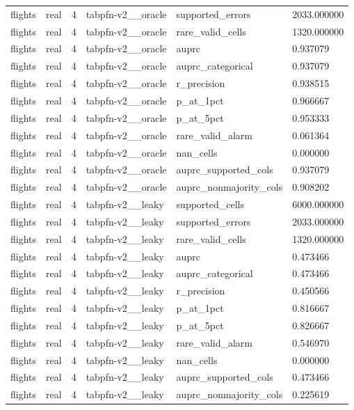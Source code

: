 \begin{tabular}{llllll}
flights & real & 4 & tabpfn-v2\_\_oracle & supported\_errors & 2033.000000 \\
flights & real & 4 & tabpfn-v2\_\_oracle & rare\_valid\_cells & 1320.000000 \\
flights & real & 4 & tabpfn-v2\_\_oracle & auprc & 0.937079 \\
flights & real & 4 & tabpfn-v2\_\_oracle & auprc\_categorical & 0.937079 \\
flights & real & 4 & tabpfn-v2\_\_oracle & r\_precision & 0.938515 \\
flights & real & 4 & tabpfn-v2\_\_oracle & p\_at\_1pct & 0.966667 \\
flights & real & 4 & tabpfn-v2\_\_oracle & p\_at\_5pct & 0.953333 \\
flights & real & 4 & tabpfn-v2\_\_oracle & rare\_valid\_alarm & 0.061364 \\
flights & real & 4 & tabpfn-v2\_\_oracle & nan\_cells & 0.000000 \\
flights & real & 4 & tabpfn-v2\_\_oracle & auprc\_supported\_cols & 0.937079 \\
flights & real & 4 & tabpfn-v2\_\_oracle & auprc\_nonmajority\_cols & 0.908202 \\
flights & real & 4 & tabpfn-v2\_\_leaky & supported\_cells & 6000.000000 \\
flights & real & 4 & tabpfn-v2\_\_leaky & supported\_errors & 2033.000000 \\
flights & real & 4 & tabpfn-v2\_\_leaky & rare\_valid\_cells & 1320.000000 \\
flights & real & 4 & tabpfn-v2\_\_leaky & auprc & 0.473466 \\
flights & real & 4 & tabpfn-v2\_\_leaky & auprc\_categorical & 0.473466 \\
flights & real & 4 & tabpfn-v2\_\_leaky & r\_precision & 0.450566 \\
flights & real & 4 & tabpfn-v2\_\_leaky & p\_at\_1pct & 0.816667 \\
flights & real & 4 & tabpfn-v2\_\_leaky & p\_at\_5pct & 0.826667 \\
flights & real & 4 & tabpfn-v2\_\_leaky & rare\_valid\_alarm & 0.546970 \\
flights & real & 4 & tabpfn-v2\_\_leaky & nan\_cells & 0.000000 \\
flights & real & 4 & tabpfn-v2\_\_leaky & auprc\_supported\_cols & 0.473466 \\
flights & real & 4 & tabpfn-v2\_\_leaky & auprc\_nonmajority\_cols & 0.225619 \\

\end{tabular}
